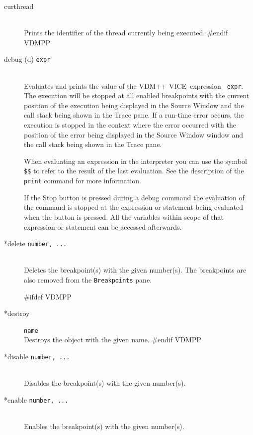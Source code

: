 \documentclass[\pformat,12pt]{article}
\newcommand{\vdmslpp}{VDM-SL}
\newcommand{\vdmslpp}{VDM++}
\renewcommand{\vdmslpp}{VDM++ VICE}
\newcommand{\guicmd}[1]{{\sf #1}}
\newcommand{\guicmd}[1]{{\gt #1}}
\begin{document}
\begin{description}
\item[curthread]\mbox{}\\
  Prints the identifier of the thread currently being executed.
#endif VDMPP

\item[debug (d) {\tt expr}]  \mbox{}\\
  Evaluates and prints the value of the \vdmslpp\ expression {\tt
    expr}.  The execution will be stopped at all enabled breakpoints
   with the current position of the execution being
  displayed in the  \guicmd{Source Window} and the call stack being
  shown in the 
  \guicmd{Trace} pane. If a run-time error occurs, the
  execution is stopped in the context where the error occurred
  with the position of the error being displayed in the \guicmd{Source Window}
  window and the call stack being shown in the \guicmd{Trace}
  pane.
  
  When evaluating an expression in the interpreter you can use the 
  symbol {\tt \$\$}\index{\$\$} to refer to the result of the last
  evaluation. See the description of the {\tt print} command for more
  information.
  
  If the \guicmd{Stop} button is pressed during a
  debug 
  command the evaluation of the command is stopped at the expression
  or statement being evaluated when the button is pressed. All the
  variables within scope of that expression or statement can be
  accessed afterwards.
  
\item[*delete {\tt number, ...}] 
\mbox{}\\
  Deletes the breakpoint(s) with the given number(s). The breakpoints
  are also removed from the \texttt{Breakpoints} pane.
  
#ifdef VDMPP
\item[*destroy] {\tt name}\mbox{}\\
  Destroys the object with the given name.
#endif VDMPP

\item[*disable \texttt{number, ...}]
\mbox{}\\
  Disables the breakpoint(s) with the given number(s).
  
\item[*enable \texttt{number, ...}]
\mbox{}\\
  Enables the breakpoint(s) with the given number(s).
  

\end{description}
\end{document}
